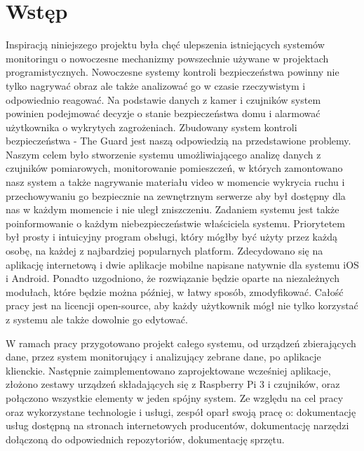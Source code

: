 \chapter{Wstęp}
Inspiracją niniejszego projektu była chęć ulepszenia istniejących systemów monitoringu o nowoczesne mechanizmy powszechnie używane w projektach programistycznych.
Nowoczesne systemy kontroli bezpieczeństwa powinny nie tylko nagrywać obraz ale także analizować go w czasie rzeczywistym i odpowiednio reagować. Na podstawie danych z kamer i czujników system powinien podejmować decyzje o stanie bezpieczeństwa domu i alarmować użytkownika o wykrytych zagrożeniach.
Zbudowany system kontroli bezpieczeństwa - The Guard jest naszą odpowiedzią na przedstawione problemy. Naszym celem było stworzenie systemu umożliwiającego analizę danych z czujników pomiarowych, monitorowanie pomieszczeń, w których zamontowano nasz system a także nagrywanie materiału video w momencie wykrycia ruchu i przechowywaniu go bezpiecznie na zewnętrznym serwerze aby był dostępny dla nas w każdym momencie i nie uległ zniszczeniu. Zadaniem systemu jest także poinformowanie o każdym niebezpieczeństwie właściciela systemu. Priorytetem był prosty i intuicyjny program obsługi, który mógłby być użyty przez każdą osobę, na każdej z najbardziej popularnych platform. Zdecydowano się na aplikację internetową i dwie aplikacje mobilne napisane natywnie dla systemu iOS i Android. Ponadto uzgodniono, że rozwiązanie będzie oparte na niezależnych modułach, które będzie można później, w łatwy sposób, zmodyfikować. Całość pracy jest na licencji open-source, aby każdy użytkownik mógł nie tylko korzystać z systemu ale także dowolnie go edytować.

W ramach pracy przygotowano projekt całego systemu, od urządzeń zbierających dane, przez system monitorujący i analizujący zebrane dane, po aplikacje klienckie. Następnie zaimplementowano zaprojektowane wcześniej aplikacje, złożono zestawy urządzeń składających się z Raspberry Pi 3 i czujników, oraz połączono wszystkie elementy w jeden spójny system.
Ze względu na cel pracy oraz wykorzystane technologie i usługi, zespół oparł swoją pracę o: dokumentację usług dostępną na stronach internetowych producentów, dokumentację narzędzi dołączoną do odpowiednich repozytoriów, dokumentację sprzętu.

